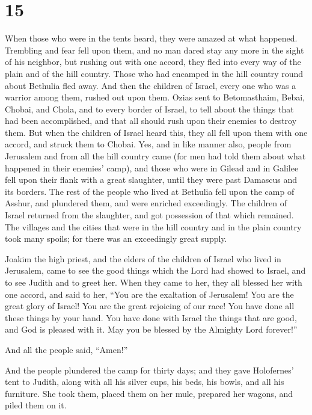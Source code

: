 \hypertarget{section-14}{%
\section{15}\label{section-14}}

 When those who were in the tents heard, they were amazed at
what happened.  Trembling and fear fell upon them, and no
man dared stay any more in the sight of his neighbor, but rushing out
with one accord, they fled into every way of the plain and of the hill
country.  Those who had encamped in the hill country round
about Bethulia fled away. And then the children of Israel, every one who
was a warrior among them, rushed out upon them.  Ozias sent
to Betomasthaim, Bebai, Chobai, and Chola, and to every border of
Israel, to tell about the things that had been accomplished, and that
all should rush upon their enemies to destroy them.  But
when the children of Israel heard this, they all fell upon them with one
accord, and struck them to Chobai. Yes, and in like manner also, people
from Jerusalem and from all the hill country came (for men had told them
about what happened in their enemies' camp), and those who were in
Gilead and in Galilee fell upon their flank with a great slaughter,
until they were past Damascus and its borders.  The rest of
the people who lived at Bethulia fell upon the camp of Asshur, and
plundered them, and were enriched exceedingly.  The children
of Israel returned from the slaughter, and got possession of that which
remained. The villages and the cities that were in the hill country and
in the plain country took many spoils; for there was an exceedingly
great supply.

 Joakim the high priest, and the elders of the children of
Israel who lived in Jerusalem, came to see the good things which the
Lord had showed to Israel, and to see Judith and to greet her.
 When they came to her, they all blessed her with one
accord, and said to her, ``You are the exaltation of Jerusalem! You are
the great glory of Israel! You are the great rejoicing of our race!
 You have done all these things by your hand. You have done
with Israel the things that are good, and God is pleased with it. May
you be blessed by the Almighty Lord forever!''

And all the people said, ``Amen!''

 And the people plundered the camp for thirty days; and
they gave Holofernes' tent to Judith, along with all his silver cups,
his beds, his bowls, and all his furniture. She took them, placed them
on her mule, prepared her wagons, and piled them on it.

